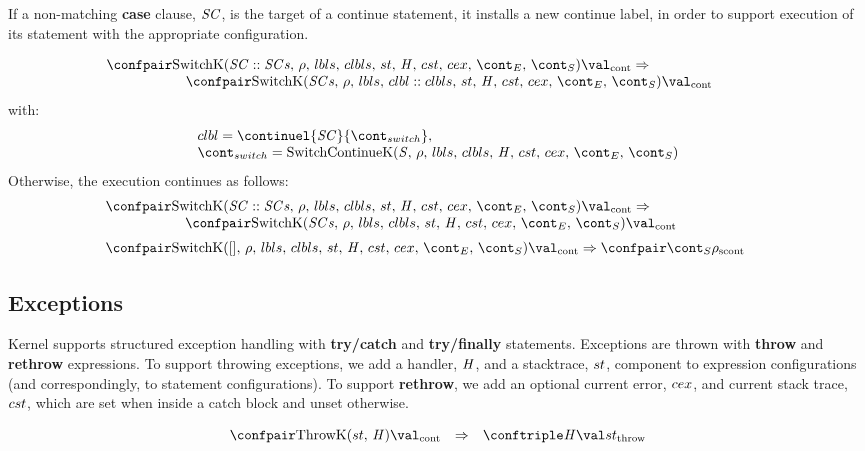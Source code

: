 \documentclass{article}
\begin{document}
\noindent
If a non-matching \textbf{case} clause, $\mathit{SC}$, is the target of a continue statement, it installs a new continue label, in order to support execution of its statement with the appropriate configuration.

\[
  \begin{array}{lcl}
	\contconf{\SwitchK{\scase :: \scases}{\clbls}}{\val}
	\Rightarrow \hspace{30mm}\\
	\hspace{20mm}\contconf{\SwitchK{\scases}{\clbl :: \clbls}}{\val}
  \end{array}
\]
with:
\[
  \begin{array}{l}
	\clbl = \continuel{\scase}{\switchcont},\\
	\switchcont = \ContinueK
  \end{array}
\]
\noindent
Otherwise, the execution continues as follows:
\[
  \begin{array}{lcl}
    \contconf{\SwitchK{\scase :: \scases}{\clbls}}{\val}
	\Rightarrow \hspace{30mm}\\
	\hspace{20mm}\contconf{\SwitchK{\scases}{\clbls}}{\val}\\[2mm]

	\contconf{\SwitchK{[]}{\clbls}}{\val}
	\Rightarrow
	\scontconf{\scont}{\env}
  \end{array}
\]

\subsection{Exceptions}

Kernel supports structured exception handling with \textbf{try/catch} and \textbf{try/finally} statements.
Exceptions are thrown with \textbf{throw} and \textbf{rethrow} expressions.
To support throwing exceptions, we add a handler, $\mathit{H}$, and a stacktrace, $st$, component to expression configurations (and correspondingly, to statement configurations).
To support \textbf{rethrow}, we add an optional current error, $cex$, and current stack trace, $cst$, which are set when inside a catch block and unset otherwise.

\[
  \begin{array}{lcl}
	\contconf{\ThrowH{\strace}{\handler}}{\val}
	& \Rightarrow &
	\throwconf{\handler}{\val}{\strace}\\[2mm]

  \end{array}
\]
\end{document}
